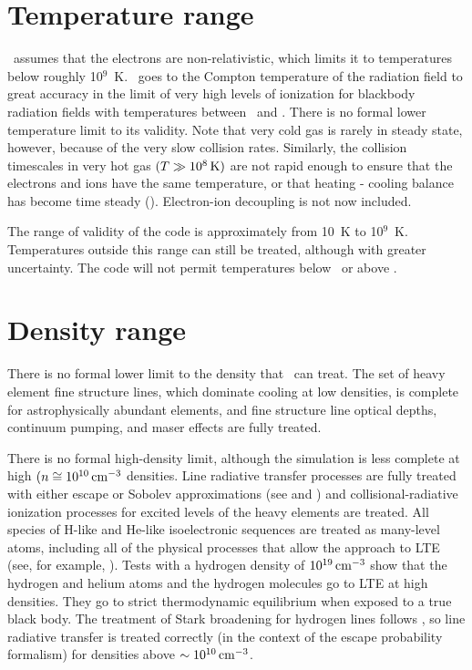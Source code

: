 \section{Temperature range}

\Cloudy\ assumes that the electrons are non-relativistic, which limits
it to temperatures below roughly 10$^9$~K.
\Cloudy\ goes to the Compton
temperature of the radiation field to great accuracy in the limit of very
high levels of ionization for blackbody radiation fields with temperatures
between \TEMPLIMITLOW\ and \TEMPLIMITHIGH.
There is no formal lower temperature limit to
its validity.
Note that very cold gas is rarely in steady state, however,
because of the very slow collision rates.
Similarly, the collision
timescales in very hot gas $(T \gg 10^8 {\rm\thinspace K})$ are not rapid enough
to ensure that
the electrons and ions have the same temperature,
or that heating - cooling
balance has become time steady (\citealp{Johnson2007}).
Electron-ion
decoupling is not now included.

The range of validity of the code is approximately from 10~K to 10$^9$~K.
Temperatures outside this range can still be treated,
although with greater
uncertainty.
The code will not permit temperatures below \TEMPLIMITLOW\ or above
\TEMPLIMITHIGH.

\section{Density range}

There is no formal lower limit to the density that \Cloudy\ can treat.
The set of heavy element fine structure lines, which dominate cooling at
low densities, is complete for astrophysically abundant elements, and fine
structure line optical depths, continuum pumping, and maser effects are
fully treated.

There is no formal high-density limit, although the simulation is less
complete at high $(n \cong 10^{10} {\rm\thinspace cm^{-3}}$ densities.
Line radiative transfer processes are fully treated with 
either escape or Sobolev approximations 
(see \citealp{Kalkofen1987} and  \citealp{Avrett1988})
and collisional-radiative ionization
processes for excited levels of the heavy elements are treated.
All species of H-like
and He-like isoelectronic sequences are treated as many-level atoms,
including all of the physical processes that allow the approach
to LTE (see, for example, \citealp{Mihalas1978}).
Tests with a hydrogen density of $10^{19} {\rm\thinspace cm^{-3}}$
show that the hydrogen and helium atoms and the hydrogen molecules go to
LTE at high densities.
They go to strict thermodynamic equilibrium when
exposed to a true black body.
The treatment of Stark broadening for hydrogen
lines follows \citet{Puetter1981},
so line radiative transfer is treated correctly
(in the context of the escape probability formalism) for densities above
$\sim10^{10} {\rm\thinspace cm^{-3}}$.

